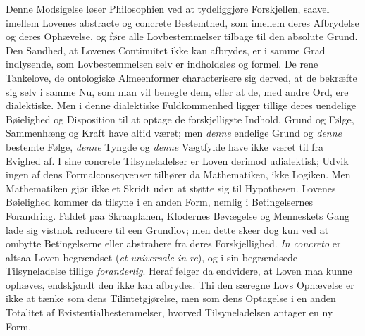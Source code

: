 \documentclass[12pt]{book}
\newcommand{\opage}[1]{\marginnote{\footnotesize\textit{[#1]}}}
\begin{document}
Denne Modsigelse løser Philosophien ved at tydeliggjøre Forskjellen, saavel imellem Lovenes
abstracte og concrete Bestemthed, som imellem deres Afbrydelse og deres Ophævelse, og føre
alle Lovbestemmelser tilbage til den absolute Grund. Den Sandhed, at Lovenes Continuitet ikke
kan afbrydes, er i samme Grad indlysende, som Lovbestemmelsen selv er indholdsløs og formel.
De rene Tankelove, de ontologiske Almeenformer characterisere sig derved, at de bekræfte sig
selv i samme Nu, som man vil benegte dem, eller at de, med andre Ord, ere dialektiske. Men i
denne dialektiske Fuldkommenhed ligger tillige deres uendelige Bøielighed og Disposition til
at optage de forskjelligste Indhold.
\opage{148} %
Grund og Følge, Sammenhæng og Kraft have altid været; men \emph{denne} endelige Grund og
\emph{denne} bestemte Følge, \emph{denne} Tyngde og \emph{denne} Vægtfylde have ikke været
til fra Evighed af. I sine concrete Tilsyneladelser er Loven derimod udialektisk;
Udvik ingen af dens Formalconseqvenser tilhører da Mathematiken, ikke Logiken. Men
Mathematiken gjør ikke et Skridt uden at støtte sig til Hypothesen. Lovenes Bøielighed
kommer da tilsyne i en anden Form, nemlig i Betingelsernes Forandring. Faldet paa
Skraaplanen, Klodernes Bevægelse og Menneskets Gang lade sig vistnok reducere til een
Grundlov; men dette skeer dog kun ved at ombytte Betingelserne eller abstrahere fra deres
Forskjellighed. \textit{In concreto} er altsaa Loven begrændset (\textit{et universale in
re}), og i sin begrændsede Tilsyneladelse tillige \emph{foranderlig}. Heraf følger da
endvidere, at Loven maa kunne ophæves, endskjøndt den ikke kan afbrydes. Thi den særegne Lovs
Ophævelse er ikke at tænke som dens Tilintetgjørelse, men som dens Optagelse i en anden
Totalitet af Existentialbestemmelser, hvorved Tilsyneladelsen antager en ny Form.
\end{document}
